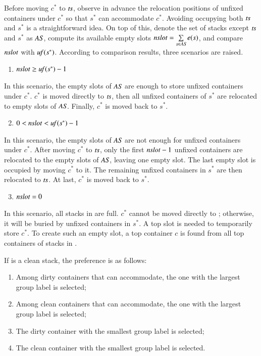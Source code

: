 \documentclass[review,3p,times,authoryear,12pt]{elsarticle}
\begin{document}
Before moving $c^*$ to $\id{ts}$, observe in advance the relocation positions of unfixed containers under $c^*$ so that $s^*$ can accommodate $c^*$. Avoiding occupying both $\id{ts}$ and $s^*$ is a straightforward idea. On top of this, denote the set of stacks except $\id{ts}$ and $s^*$ as $\id{AS}$, compute its available empty slots $\id{nslot} = \sum\limits_{s\in \id{AS}}e(s)$, and compare $\id{nslot}$ with $\id{uf}(s^*)$. According to comparison results, three scenarios are raised.

\begin{enumerate}
\setcounter{enumi}{0}
\item $\id{nslot}\ge \id{uf}(s^*)-1$
\end{enumerate}
In this scenario, the empty slots of $\id{AS}$ are enough to store unfixed containers under $c^*$. $c^*$ is moved directly to $\id{ts}$, then all unfixed containers of $s^*$ are relocated to empty slots of $\id{AS}$. Finally, $c^*$ is moved back to $s^*$.

\begin{enumerate}
\setcounter{enumi}{1}
\item $0<\id{nslot}< \id{uf}(s^*)-1$
\end{enumerate}
In this scenario, the empty slots of $\id{AS}$ are not enough for unfixed containers under $c^*$. After moving $c^*$ to $\id{ts}$, only the first $\id{nslot}-1$ unfixed containers are relocated to the empty slots of $\id{AS}$, leaving one empty slot. The last empty slot is occupied by moving $c^*$ to it. The remaining unfixed containers in $s^*$ are then relocated to $\id{ts}$. At last, $c^*$ is moved back to $s^*$.
\begin{enumerate}
\setcounter{enumi}{2}
\item $\id{nslot}=0$
\end{enumerate}
In this scenario, all stacks in  are full. $c^*$ cannot be moved directly to ; otherwise, it will be buried by unfixed containers in $s^*$. A top slot is needed to temporarily store $c^*$. To create such an empty slot, a top container $c$ is found from all top containers of stacks in .

If  is a clean stack, the preference is as follows:
\begin{enumerate}[1.]
\item Among dirty containers that  can accommodate, the one with the largest group label is selected;
\item Among clean containers that  can accommodate, the one with the largest group label is selected;
\item The dirty container with the smallest group label is selected;
\item The clean container with the smallest group label is selected.
\end{enumerate}
\end{document}
